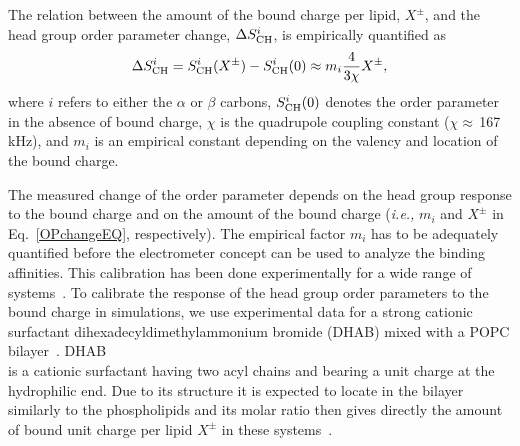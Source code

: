 The relation between the amount of the bound charge per lipid, $X^\pm$, and the head group order parameter change, $\Delta S_{\rm{CH}}^{i}$, is empirically quantified as~\citep{seelig87,ferreira16} 
\begin{equation}\label{OPchangeEQ} 
\Delta S_{\rm{CH}}^{i}= S_{\rm{CH}}^{i}(X^\pm)-S_{\rm{CH}}^{i}(0) \approx m_i \frac{4 }{3\chi}X^\pm, 
\end{equation} 
where $i$ refers to either the $\alpha$ or $\beta$ carbons, $S_{\rm{CH}}^{i}(0)$ denotes the order parameter in the absence of bound charge, $\chi$ is the quadrupole coupling constant ($\chi \approx$\,167\,kHz), and $m_i$ is an empirical constant depending on the valency and location of the bound charge. 
 
 
The measured change of the order parameter depends on the head group response to the bound charge and on the amount of the bound charge (\textit{i.e.,} $m_i$ and $X^\pm$ in Eq.~\ref{OPchangeEQ}, respectively).  
The empirical factor $m_i$ has to be adequately quantified before the electrometer concept can be used to analyze the binding affinities. 
This calibration has been done experimentally for a wide range of systems~\citep{seelig87, beschiasvili91}. 
To calibrate the response of the head group order parameters to the bound charge in simulations, we use experimental data for a strong cationic surfactant dihexadecyldimethylammonium bromide  (DHAB) mixed with a POPC bilayer~\citep{scherer89}. DHAB\\[0.5cm] 
is a cationic surfactant having two acyl chains and bearing a unit charge at the hydrophilic end. 
Due to its structure it is expected to locate in the bilayer similarly to the phospholipids and its molar ratio then gives directly the amount of bound unit charge per lipid $X^\pm$ in these systems~\citep{scherer89}. 
 




